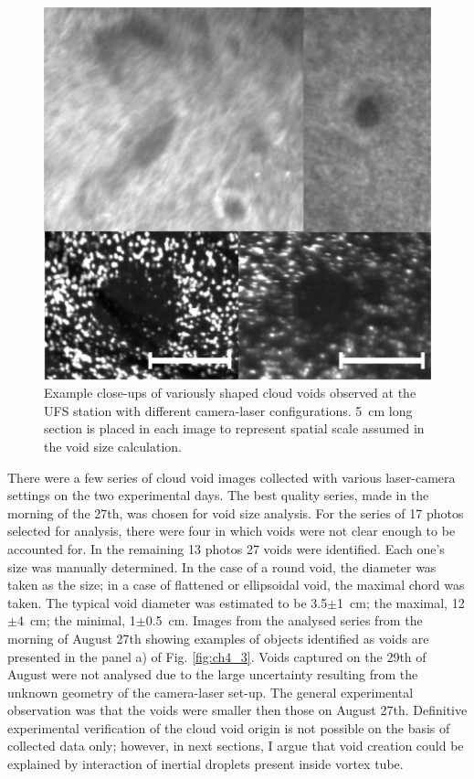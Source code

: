 \documentclass[../main.tex]{subfiles}
\begin{document}
\begin{figure}[h]
\centering
\noindent\includegraphics[width=35pc]{gfx/closeups.png}
\caption{Example close-ups of variously shaped cloud voids observed at the UFS station with different camera-laser configurations. 5~cm long section is placed in each image to represent spatial scale assumed in the void size calculation.}
\label{fig:ch4_4}
\end{figure}

There were a few series of cloud void images collected with various laser-camera settings on the two experimental days. The best quality series, made in the morning of the 27th, was chosen for void size analysis. For the series of 17 photos selected for analysis, there were four in which voids were not clear enough to be accounted for. In the remaining 13 photos 27 voids were identified. Each one's size was manually determined. In the case of a round void, the diameter was taken as the size; in a case of flattened or ellipsoidal void, the maximal chord was taken. The typical void diameter was estimated to be 3.5$\pm$1~cm; the maximal, 12$\pm$4~cm; the minimal, 1$\pm$0.5~cm. Images from the analysed series from the morning of August 27th showing examples of objects identified as voids are presented in the panel a) of Fig. \ref{fig:ch4_3}. Voids captured on the 29th of August were not analysed due to the large uncertainty resulting from the unknown geometry of the camera-laser set-up. The general experimental observation was that the voids were smaller then those on August 27th. Definitive experimental verification of the cloud void origin is not possible on the basis of collected data only; however, in next sections, I argue that void creation could be explained by interaction of inertial droplets present inside vortex tube.
\end{document}
